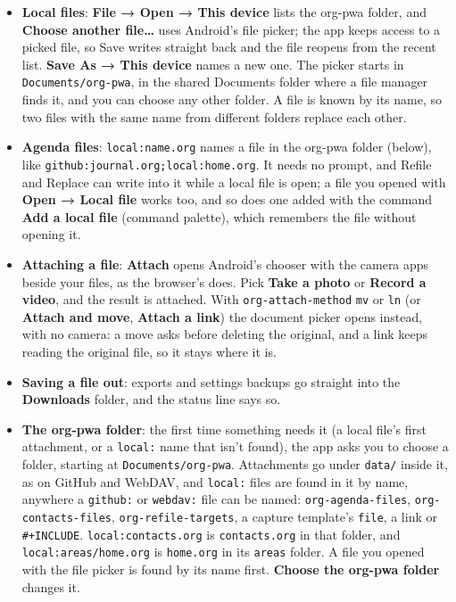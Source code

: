 \documentclass[11pt]{article}
\begin{document}
\begin{itemize}
\item \textbf{Local files}: \textbf{File → Open → This device} lists the org-pwa folder, and \textbf{Choose another file…} uses Android's file picker; the app keeps access to a picked file, so Save writes straight back and the file reopens from the recent list. \textbf{Save As → This device} names a new one. The picker starts in \texttt{Documents/org-pwa}, in the shared Documents folder where a file manager finds it, and you can choose any other folder. A file is known by its name, so two files with the same name from different folders replace each other.
\item \textbf{Agenda files}: \texttt{local:name.org} names a file in the org-pwa folder (below), like \texttt{github:journal.org;local:home.org}. It needs no prompt, and Refile and Replace can write into it while a local file is open; a file you opened with \textbf{Open → Local file} works too, and so does one added with the command \textbf{Add a local file} (command palette), which remembers the file without opening it.
\item \textbf{Attaching a file}: \textbf{Attach} opens Android's chooser with the camera apps beside your files, as the browser's does. Pick \textbf{Take a photo} or \textbf{Record a video}, and the result is attached. With \texttt{org-attach-method} \texttt{mv} or \texttt{ln} (or \textbf{Attach and move}, \textbf{Attach a link}) the document picker opens instead, with no camera: a move asks before deleting the original, and a link keeps reading the original file, so it stays where it is.
\item \textbf{Saving a file out}: exports and settings backups go straight into the \textbf{Downloads} folder, and the status line says so.
\item \textbf{The org-pwa folder}: the first time something needs it (a local file's first attachment, or a \texttt{local:} name that isn't found), the app asks you to choose a folder, starting at \texttt{Documents/org-pwa}. Attachments go under \texttt{data/} inside it, as on GitHub and WebDAV, and \texttt{local:} files are found in it by name, anywhere a \texttt{github:} or \texttt{webdav:} file can be named: \texttt{org-agenda-files}, \texttt{org-contacts-files}, \texttt{org-refile-targets}, a capture template's \texttt{file}, a link or \texttt{\#+INCLUDE}. \texttt{local:contacts.org} is \texttt{contacts.org} in that folder, and \texttt{local:areas/home.org} is \texttt{home.org} in its \texttt{areas} folder. A file you opened with the file picker is found by its name first. \textbf{Choose the org-pwa folder} changes it.

\end{itemize}
\end{document}

